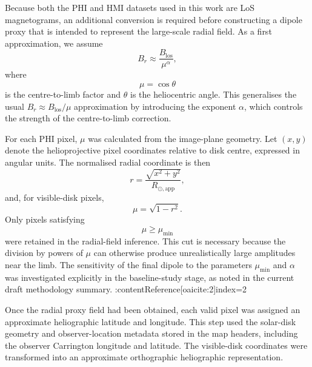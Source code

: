 \documentclass[namedreferences,hyperref,optionalrh]{spr-sola}
\begin{document}

Because both the PHI and HMI datasets used in this work are LoS magnetograms, an additional conversion is required before constructing a dipole proxy that is intended to represent the large-scale radial field. As a first approximation, we assume
\begin{equation}
    B_r \approx \frac{B_{\mathrm{los}}}{\mu^\alpha},
\end{equation}
where
\begin{equation}
    \mu = \cos\theta
\end{equation}
is the centre-to-limb factor and $\theta$ is the heliocentric angle. This generalises the usual $B_r \approx B_{\mathrm{los}}/\mu$ approximation by introducing the exponent $\alpha$, which controls the strength of the centre-to-limb correction.

For each PHI pixel, $\mu$ was calculated from the image-plane geometry. Let $(x,y)$ denote the helioprojective pixel coordinates relative to disk centre, expressed in angular units. The normalised radial coordinate is then
\begin{equation}
    r = \frac{\sqrt{x^2+y^2}}{R_{\odot,\mathrm{app}}},
\end{equation}
and, for visible-disk pixels,
\begin{equation}
    \mu = \sqrt{1-r^2}.
\end{equation}
Only pixels satisfying
\begin{equation}
    \mu \ge \mu_{\min}
\end{equation}
were retained in the radial-field inference. This cut is necessary because the division by powers of $\mu$ can otherwise produce unrealistically large amplitudes near the limb. The sensitivity of the final dipole to the parameters $\mu_{\min}$ and $\alpha$ was investigated explicitly in the baseline-study stage, as noted in the current draft methodology summary. :contentReference[oaicite:2]{index=2}


Once the radial proxy field had been obtained, each valid pixel was assigned an approximate heliographic latitude and longitude. This step used the solar-disk geometry and observer-location metadata stored in the map headers, including the observer Carrington longitude and latitude. The visible-disk coordinates were transformed into an approximate orthographic heliographic representation.
\end{document}
